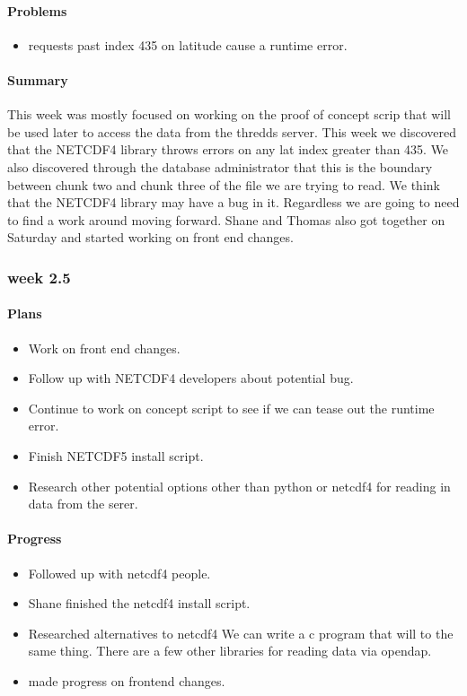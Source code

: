 \documentclass[onecolumn, draftclsnofoot,10pt, compsoc]{article}
\begin{document}
			\paragraph{Problems} \hfill \break
				\begin{itemize}
					\item requests past index 435 on latitude cause a runtime error.
				\end{itemize}
			\paragraph{Summary} \hfill \break
			This week was mostly focused on working on the proof of concept scrip that will be used later to access the data from the thredds server. This week we discovered that the NETCDF4 library throws errors on any lat index greater than 435. We also discovered through the database administrator that this is the boundary between chunk two and chunk three of the file we are trying to read. We think that the NETCDF4 library may have a bug in it. Regardless we are going to need to find a work around moving forward. Shane and Thomas also got together on Saturday and started working on front end changes.\\

		\subsubsection{week 2.5}
			\paragraph{Plans} \hfill \break
				\begin{itemize}
					\item Work on front end changes.
					\item Follow up with NETCDF4 developers about potential bug.
					\item Continue to work on concept script to see if we can tease out the runtime error.
					\item Finish NETCDF5 install script.
					\item Research other potential options other than python or netcdf4 for reading in data from the serer.\\
				\end{itemize}
			\paragraph{Progress} \hfill \break
				\begin{itemize}
					\item Followed up with netcdf4 people.
					\item Shane finished the netcdf4 install script.
					\item Researched alternatives to netcdf4 We can write a c program that will to the same thing. There are a few other libraries for reading data via opendap.
					\item made progress on frontend changes.
				\end{itemize}
\end{document}
